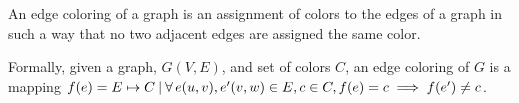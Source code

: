 \begin{defi}
\label{def:ec}
An edge coloring of a graph is an assignment of colors to the edges of a graph in such a way that no two adjacent edges are assigned the same color. 

Formally, given a graph, $G(V,E)$, and set of colors $C$, an edge coloring of $G$ is a mapping $f(e) = E \mapsto C {\: |\:} \forall\, e(u,v), e'(v,w) \in E, c \in C, f(e) = c \implies f(e') \ne c$.

\end{defi}

